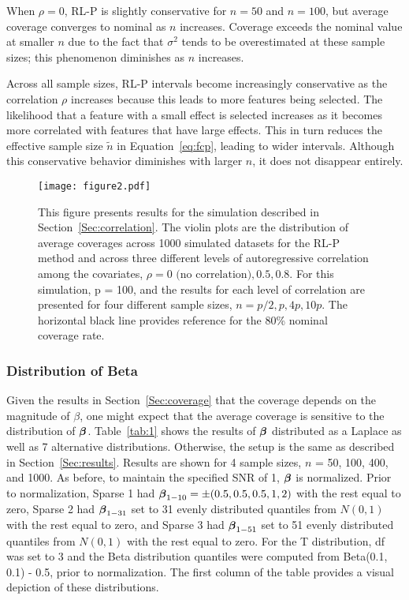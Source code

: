 When $\rho = 0$, RL-P is slightly conservative for $n = 50$ and $n = 100$, but average coverage converges to nominal as $n$ increases. Coverage exceeds the nominal value at smaller $n$ due to the fact that $\sigma^2$ tends to be overestimated at these sample sizes; this phenomenon diminishes as $n$ increases.

Across all sample sizes, RL-P intervals become increasingly conservative as the correlation $\rho$ increases because this leads to more features being selected. The likelihood that a feature with a small effect is selected increases as it becomes more correlated with features that have large effects. This in turn reduces the effective sample size $\tilde{n}$ in Equation~\ref{eq:fcp}, leading to wider intervals. Although this conservative behavior diminishes with larger $n$, it does not disappear entirely.

\begin{figure}[htb!]
  \begin{center}
    \texttt{[image: figure2.pdf]}
    \caption{\label{fig:2} This figure presents results for the simulation described in Section~\ref{Sec:correlation}. The violin plots are the distribution of average coverages across 1000 simulated datasets for the RL-P method and across three different levels of autoregressive correlation among the covariates, $\rho = 0 \text{ (no correlation)}, 0.5, 0.8$. For this simulation, p = 100, and the results for each level of correlation are presented for four different sample sizes, $n = p/2, p, 4p, 10p$. The horizontal black line provides reference for the 80\% nominal coverage rate.}
  \end{center}
\end{figure}

\subsubsection{Distribution of Beta} \label{Sec:distribution}

Given the results in Section~\ref{Sec:coverage} that the coverage depends on the magnitude of $\beta$, one might expect that the average coverage is sensitive to the distribution of $\boldsymbol{\beta}$. Table~\ref{tab:1} shows the results of $\boldsymbol{\beta}$ distributed as a Laplace as well as 7 alternative distributions. Otherwise, the setup is the same as described in Section~\ref{Sec:results}. Results are shown for 4 sample sizes, $n$ = 50, 100, 400, and 1000. As before, to maintain the specified SNR of 1, $\boldsymbol{\beta}$ is normalized. Prior to normalization, Sparse 1 had $\boldsymbol{\beta}_{1-10} = \pm(0.5, 0.5, 0.5, 1, 2)$ with the rest equal to zero, Sparse 2 had $\boldsymbol{\beta}_{1-31}$ set to 31 evenly distributed quantiles from $N(0, 1)$ with the rest equal to zero, and Sparse 3 had $\boldsymbol{\beta}_{1-51}$ set to 51 evenly distributed quantiles from $N(0, 1)$ with the rest equal to zero. For the T distribution, df was set to 3 and the Beta distribution quantiles were computed from Beta(0.1, 0.1) - 0.5, prior to normalization. The first column of the table provides a visual depiction of these distributions.

